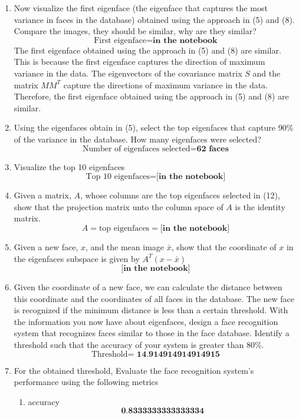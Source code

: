 \documentclass[12pt]{extarticle} %
\begin{document}
\begin{enumerate}
    \item Now visualize the first eigenface (the eigenface that captures the most variance in faces in the database) obtained using the approach in (5) and (8). Compare the images, they should be similar, why are they similar?
    \[
    \text{First eigenface} = \textbf{in the notebook}
    \]
    The first eigenface obtained using the approach in (5) and (8) are similar. This is because the first eigenface captures the direction of maximum variance in the data. The eigenvectors of the covariance matrix \(S\) and the matrix \(MM^T\) capture the directions of maximum variance in the data. Therefore, the first eigenface obtained using the approach in (5) and (8) are similar.
    \item Using the eigenfaces obtain in (5), select the top eigenfaces that capture 90\% of the variance in the database. How many eigenfaces were selected?
    \[
    \text{Number of eigenfaces selected} = \textbf{62 faces}
    \]
    \item Visualize the top 10 eigenfaces
    \[
    \text{Top 10 eigenfaces} = \textbf{[in the notebook]}
    \]
    \item  Given a matrix, \(A\), whose columns are the top eigenfaces selected in (12), show that the projection matrix unto the column space of \(A\) is the identity matrix.
    \[
    A = \text{top eigenfaces} = \textbf{[in the notebook]}
    \]
    \item Given a new face, \(x\), and the mean image \(\bar{x}\), show that the coordinate of \(x\) in the eigenfaces subspace is given by \(A^T(x-\bar{x})\)
    \[
    \textbf{[in the notebook]}
    \]
    \item Given the coordinate of a new face, we can calculate the distance between this coordinate and the
    coordinates of all faces in the database. The new face is recognized if the minimum distance is less
    than a certain threshold. With the information you now have about eigenfaces, design a face
    recognition system that recognizes faces similar to those in the face database. Identify a
    threshold such that the accuracy of your system is greater than 80\%.
    \[
    \text{Threshold} = \textbf{ 14.914914914914915}
    \]
    \item For the obtained threshold, Evaluate the face recognition system’s performance using the following
    metrics
    \begin{enumerate}
        \item accuracy
        \[
            \textbf{0.8333333333333334}
\]
\end{enumerate}
\end{enumerate}
\end{document}
